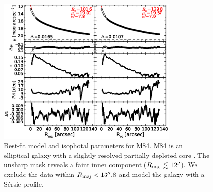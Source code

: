 \documentclass[preprint2]{emulateapj}
\newcommand{\fitfigurewidth}{0.8\textwidth}
\begin{document}
  \begin{figure}[h]
  \begin{center}
  \includegraphics[width=\fitfigurewidth]{images/m84_1Dfit.eps}
  \caption{Best-fit model and isophotal parameters for M84.
  M84 is an elliptical galaxy with a slightly resolved partially depleted core \citep{rusli2013}. %
  The unsharp mask reveals a faint inner component ($R_{\rm maj} \lesssim 12''$). 
  We exclude the data within $R_{\rm maj} < 13''.8$ and model the galaxy with a S\'ersic profile.
  }
  \end{center}
  \end{figure}
\end{document}
